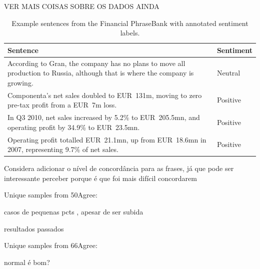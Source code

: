 \documentclass[conference]{IEEEtran}
\begin{document}

VER MAIS COISAS SOBRE OS DADOS AINDA


\begin{table}[ht]
\centering
\caption{Example sentences from the Financial PhraseBank with annotated sentiment labels.}
\label{tab:fpb_examples}
\begin{tabular}{p{6.4cm}p{1.6cm}}
\toprule
\textbf{Sentence} & \textbf{Sentiment} \\
\midrule
According to Gran, the company has no plans to move all production to Russia, although that is where the company is growing. & Neutral \\
Componenta's net sales doubled to EUR~131m, moving to zero pre-tax profit from a EUR~7m loss. & Positive \\
In Q3 2010, net sales increased by 5.2\% to EUR~205.5mn, and operating profit by 34.9\% to EUR~23.5mn. & Positive \\
Operating profit totalled EUR~21.1mn, up from EUR~18.6mn in 2007, representing 9.7\% of net sales. & Positive \\
\bottomrule
\end{tabular}
\end{table}


Considera adicionar o nível de concordância para as frases, já que pode ser interessante perceber porque é que foi mais difícil concordarem

Unique samples from 50Agree:


casos de pequenas pcts , apesar de ser subida


resultados passados


Unique samples from 66Agree:


normal é bom?

\end{document}
